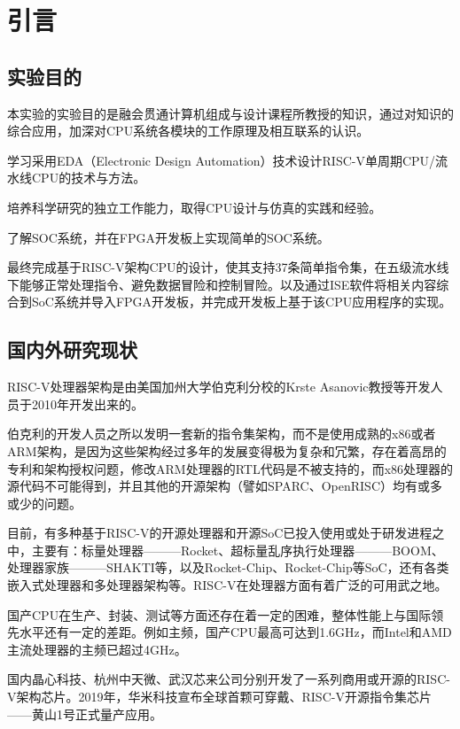 \documentclass[UTF8,a4paper,autofakebold,15pt]{ctexart}
\begin{document}
\newpage


\section{引言}

\subsection{实验目的}

	本实验的实验目的是融会贯通计算机组成与设计课程所教授的知识，通过对知识的综合应用，加深对CPU系统各模块的工作原理及相互联系的认识。
	
	学习采用EDA（Electronic Design Automation）技术设计RISC-V单周期CPU/流水线CPU的技术与方法。
	
	培养科学研究的独立工作能力，取得CPU设计与仿真的实践和经验。
	
	了解SOC系统，并在FPGA开发板上实现简单的SOC系统。
	
	最终完成基于RISC-V架构CPU的设计，使其支持37条简单指令集，在五级流水线下能够正常处理指令、避免数据冒险和控制冒险。以及通过ISE软件将相关内容综合到SoC系统并导入FPGA开发板，并完成开发板上基于该CPU应用程序的实现。

\subsection{国内外研究现状}


	RISC-V处理器架构是由美国加州大学伯克利分校的Krste Asanovic教授等开发人员于2010年开发出来的。
	
	伯克利的开发人员之所以发明一套新的指令集架构，而不是使用成熟的x86或者ARM架构，是因为这些架构经过多年的发展变得极为复杂和冗繁，存在着高昂的专利和架构授权问题，修改ARM处理器的RTL代码是不被支持的，而x86处理器的源代码不可能得到，并且其他的开源架构（譬如SPARC、OpenRISC）均有或多或少的问题。\cite{ref3}
	
	目前，有多种基于RISC-V的开源处理器和开源SoC已投入使用或处于研发进程之中，主要有：标量处理器———Rocket、超标量乱序执行处理器———BOOM、处理器家族———SHAKTI等，以及Rocket-Chip、Rocket-Chip等SoC\cite{ref5}，还有各类嵌入式处理器和多处理器架构等。RISC-V在处理器方面有着广泛的可用武之地。
	
	国产CPU在生产、封装、测试等方面还存在着一定的困难，整体性能上与国际领先水平还有一定的差距。例如主频，国产CPU最高可达到1.6GHz，而Intel和AMD主流处理器的主频已超过4GHz。\cite{ref2}
	
	国内晶心科技、杭州中天微、武汉芯来公司分别开发了一系列商用或开源的RISC-V架构芯片。2019年，华米科技宣布全球首颗可穿戴、RISC-V开源指令集芯片——黄山1号正式量产应用。\cite{ref4}
	
\end{document}
